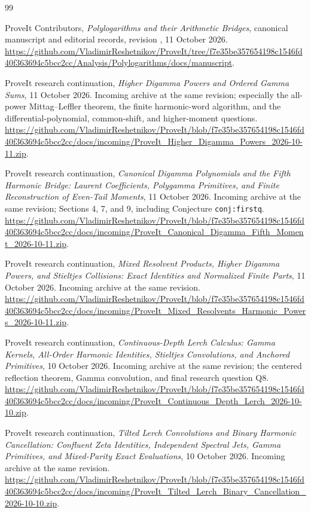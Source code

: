 \begingroup
\small
\begin{thebibliography}{99}

ProveIt Contributors,
\emph{Polylogarithms and their Arithmetic Bridges},
canonical manuscript and editorial records, revision
\texttt{\sourcecommit}, 11 October 2026.
\url{https://github.com/VladimirReshetnikov/ProveIt/tree/f7e35be357654198c1546fd40f363694c5bcc2cc/Analysis/Polylogarithms/docs/manuscript}.

ProveIt research continuation,
\emph{Higher Digamma Powers and Ordered Gamma Sums}, 11 October 2026.
Incoming archive at the same revision; especially the all-power
Mittag--Leffler theorem, the finite harmonic-word algorithm, and the
differential-polynomial, common-shift, and higher-moment questions.
\url{https://github.com/VladimirReshetnikov/ProveIt/blob/f7e35be357654198c1546fd40f363694c5bcc2cc/docs/incoming/ProveIt_Higher_Digamma_Powers_2026-10-11.zip}.

ProveIt research continuation,
\emph{Canonical Digamma Polynomials and the Fifth Harmonic Bridge:
Laurent Coefficients, Polygamma Primitives, and Finite Reconstruction
of Even-Tail Moments}, 11 October 2026.
Incoming archive at the same revision; Sections 4, 7, and 9,
including Conjecture \texttt{conj:firstq}.
\url{https://github.com/VladimirReshetnikov/ProveIt/blob/f7e35be357654198c1546fd40f363694c5bcc2cc/docs/incoming/ProveIt_Canonical_Digamma_Fifth_Moment_2026-10-11.zip}.

ProveIt research continuation,
\emph{Mixed Resolvent Products, Higher Digamma Powers, and Stieltjes
Collisions: Exact Identities and Normalized Finite Parts},
11 October 2026. Incoming archive at the same revision.
\url{https://github.com/VladimirReshetnikov/ProveIt/blob/f7e35be357654198c1546fd40f363694c5bcc2cc/docs/incoming/ProveIt_Mixed_Resolvents_Harmonic_Powers_2026-10-11.zip}.

ProveIt research continuation,
\emph{Continuous-Depth Lerch Calculus: Gamma Kernels, All-Order Harmonic
Identities, Stieltjes Convolutions, and Anchored Primitives},
10 October 2026. Incoming archive at the same revision; the centered
reflection theorem, Gamma convolution, and final research question Q8.
\url{https://github.com/VladimirReshetnikov/ProveIt/blob/f7e35be357654198c1546fd40f363694c5bcc2cc/docs/incoming/ProveIt_Continuous_Depth_Lerch_2026-10-10.zip}.

ProveIt research continuation,
\emph{Tilted Lerch Convolutions and Binary Harmonic Cancellation:
Confluent Zeta Identities, Independent Spectral Jets, Gamma Primitives,
and Mixed-Parity Exact Evaluations}, 10 October 2026.
Incoming archive at the same revision.
\url{https://github.com/VladimirReshetnikov/ProveIt/blob/f7e35be357654198c1546fd40f363694c5bcc2cc/docs/incoming/ProveIt_Tilted_Lerch_Binary_Cancellation_2026-10-10.zip}.


\end{thebibliography}
